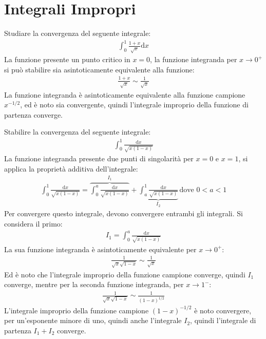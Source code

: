 \documentclass{article}
\numberwithin{equation}{subsection}
\begin{document}
\clearpage

\section{Integrali Impropri}

Studiare la convergenza del seguente integrale:
\begin{gather*}
\displaystyle\int_0^1\frac{1+x}{\sqrt{x}}\mathrm{d}x
\end{gather*}
La funzione presente un punto critico in $x=0$, la funzione integranda per $x\to0^+$ si può stabilire sia asintoticamente equivalente alla funzione:
\begin{gather*}
    \displaystyle\frac{1+x}{\sqrt{x}}\sim\frac{1}{\sqrt{x}}
\end{gather*}
La funzione integranda è asintoticamente equivalente alla funzione campione $x^{-1/2}$, ed è noto sia convergente, quindi l'integrale improprio della funzione di partenza converge. 


Stabilire la convergenza del seguente integrale:
\begin{gather*}
    \displaystyle\int_0^1\frac{\mathrm{d}x}{\sqrt{x(1-x)}}
\end{gather*}
La funzione integranda presente due punti di singolarità per $x=0$ e $x=1$, si applica la proprietà additiva dell'integrale:
\begin{gather*}
    \displaystyle\int_0^1\frac{\mathrm{d}x}{\sqrt{x(1-x)}}=
    \overbrace{\int_0^a\frac{\mathrm{d}x}{\sqrt{x(1-x)}}}^{I_1}+
    \underbrace{\int_a^1\frac{\mathrm{d}x}{\sqrt{x(1-x)}}}_{I_2}\,\mbox{dove }0<a<1
\end{gather*}
Per convergere questo integrale, devono convergere entrambi gli integrali. Si considera il primo:
\begin{gather*}
    I_1=\displaystyle\int_0^a\frac{\mathrm{d}x}{\sqrt{x(1-x)}}
\end{gather*}
La sua funzione integranda è asintoticamente equivalente per $x\to0^+$:
\begin{gather*}
    \displaystyle\frac{1}{\sqrt{x}\sqrt{1-x}}\sim\frac{1}{\sqrt{x}}
\end{gather*}
Ed è noto che l'integrale improprio della funzione campione converge, quindi $I_1$ converge, mentre per la seconda funzione integranda, per $x\to1^-$:
\begin{gather*}
    \displaystyle\frac{1}{\sqrt{x}\sqrt{1-x}}\sim\frac{1}{(1-x)^{1/2}}
\end{gather*}
L'integrale improprio della funzione campione $(1-x)^{-1/2}$ è noto convergere, per un'esponente minore di uno, quindi anche l'integrale $I_2$, quindi l'integrale di partenza $I_1+I_2$ converge. 
\end{document}
